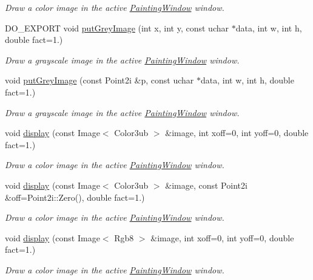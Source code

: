 \begin{DoxyCompactItemize}
\begin{DoxyCompactList}\small\item\em Draw a color image in the active \hyperlink{class_d_o_1_1_painting_window}{Painting\-Window} window. \end{DoxyCompactList}\item 
D\-O\-\_\-\-E\-X\-P\-O\-R\-T void \hyperlink{group___draw2_d_ga902ff77325fc9064fe57a1c31a11fc2d}{put\-Grey\-Image} (int x, int y, const uchar $\ast$data, int w, int h, double fact=1.)
\begin{DoxyCompactList}\small\item\em Draw a grayscale image in the active \hyperlink{class_d_o_1_1_painting_window}{Painting\-Window} window. \end{DoxyCompactList}\item 
void \hyperlink{group___draw2_d_ga4ccda4964985ca1bc9d143345d2fd75f}{put\-Grey\-Image} (const Point2i \&p, const uchar $\ast$data, int w, int h, double fact=1.)
\begin{DoxyCompactList}\small\item\em Draw a grayscale image in the active \hyperlink{class_d_o_1_1_painting_window}{Painting\-Window} window. \end{DoxyCompactList}\item 
void \hyperlink{group___draw2_d_ga0e5d4d3aadae2bf37d6faa1e8b84c5e9}{display} (const Image$<$ Color3ub $>$ \&image, int xoff=0, int yoff=0, double fact=1.)
\begin{DoxyCompactList}\small\item\em Draw a color image in the active \hyperlink{class_d_o_1_1_painting_window}{Painting\-Window} window. \end{DoxyCompactList}\item 
void \hyperlink{group___draw2_d_ga0e452fddc5470393c55af60e940bc624}{display} (const Image$<$ Color3ub $>$ \&image, const Point2i \&off=Point2i\-::\-Zero(), double fact=1.)
\begin{DoxyCompactList}\small\item\em Draw a color image in the active \hyperlink{class_d_o_1_1_painting_window}{Painting\-Window} window. \end{DoxyCompactList}\item 
void \hyperlink{group___draw2_d_gaff59f1e3836248047c31d6cb117ad733}{display} (const Image$<$ Rgb8 $>$ \&image, int xoff=0, int yoff=0, double fact=1.)
\begin{DoxyCompactList}\small\item\em Draw a color image in the active \hyperlink{class_d_o_1_1_painting_window}{Painting\-Window} window. \end{DoxyCompactList}\item 

\end{DoxyCompactItemize}
